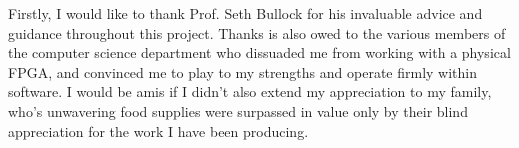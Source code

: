 Firstly, I would like to thank Prof. Seth Bullock for his invaluable
advice and guidance throughout this project.
Thanks is also owed to the various members of the computer science department
who dissuaded me from working with a physical FPGA, and convinced me to play to my strengths
and operate firmly within software. I would be amis if I didn't also extend
my appreciation to my family, who's unwavering food supplies were surpassed in value only by
their blind appreciation for the work I have been producing.
